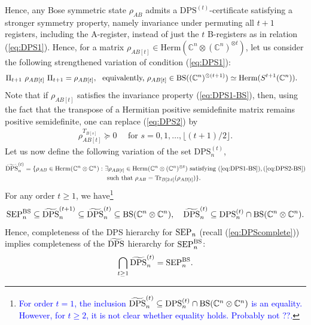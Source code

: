 \documentclass[11pt]{article}
\newcommand{\C}{\ensuremath{\mathbb{C}}} %
\newcommand{\Perm}{\mathfrak G}
\newcommand{\Herm}{\mathrm{Herm}}
\newcommand{\Cnn}{\C^n\ot \C^n}
\newcommand{\Cnnt}{\C^n\ot (\C^n)^{\ot t}}
\newcommand{\SEP}{\text{\rm SEP}}
\newcommand{\DPS}{\text{\rm DPS}}
\newcommand{\DPSt}{\mathrm{DPS}^{(t)}}
\newcommand{\SEPBS}{\SEP^{\BS}}
\newcommand{\tilDPS}{\widetilde {\DPS}}
\newcommand{\tilDPSt}{\widetilde{\DPS}^{(t)}}
\newcommand{\Tr}{\text{\rm Tr}}
\newcommand{\ot}{\otimes}
\newcommand{\BS}{\text{\rm BS}}
\newcommand{\ui}{\underline{i}}
\newcommand{\uj}{\underline{j}}
\theoremstyle{plain}
\newcommand{\ML}{\textcolor{blue}}
\begin{document}
{%
Hence,  any Bose symmetric state $\rho_{AB}$ admits a $\DPSt$-certificate satisfying a stronger symmetry property, namely invariance under permuting all $t+1$ registers, including the A-register, instead of just the $t$ B-registers as  in relation (\ref{eq:DPS1}). Hence, for a matrix $\rho_{AB[t]} \in \Herm(\Cnnt)$, let us consider the following strengthened variation of condition (\ref{eq:DPS1}):
\begin{align}\label{eq:DPS1-BS}
\begin{split}
&\Pi_{t+1} \ \rho_{AB[t]}\ \Pi_{t+1}=\rho_{AB[t]},\  \text{   equivalently, } \rho_{AB[t]}\in \BS((\C^n)^{\ot (t+1)})\simeq \Herm(S^{t+1}(\C^n)).
\end{split}
\end{align}
Note that if $\rho_{AB[t]}$ 
 satisfies  the invariance property (\ref{eq:DPS1-BS}), 
then, using the fact that the transpose of a Hermitian positive semidefinite matrix remains positive semidefinite,
 one can %
 replace (\ref{eq:DPS2}) by
 \begin{align}\label{eq:DPS2-BS}
 \rho_{AB[t]}^{T_{B[s]}}\succeq 0 \quad \text{ for } s=0, 1,\ldots,  \lfloor (t+1)/2\rfloor.
 \end{align}
Let us now define the following   variation of the set $\DPSt_n$, 
\begin{align}\label{eq:DPSt-BS}
\begin{split}
\tilDPSt_n=\{\rho_{AB}\in\Herm(\Cnn):\ &  \exists \rho_{AB[t]}\in\Herm(\Cnnt) \text{ satisfying } (\ref{eq:DPS1-BS}), (\ref{eq:DPS2-BS}) \\
& \text{ such that }   \rho_{AB}=\Tr_{B[2:t]}(\rho_{AB[t]})\}.
\end{split}
\end{align}
For any order  $t\ge 1$, we have\footnote{\ML{For order $t=1$, the inclusion $\tilDPSt_n\subseteq \DPSt_n\cap \BS(\Cnn)$ is an equality. However, for $t\ge 2$, it is not clear whether equality holds. Probably not ??.}}
$$\SEPBS_n\subseteq \tilDPS^{(t+1)}_n\subseteq \tilDPSt_n\subseteq \BS(\Cnn),\quad
\tilDPSt_n\subseteq \DPSt_n\cap \BS(\Cnn).$$
Hence, completeness of the DPS hierarchy for $\SEP_n$ (recall (\ref{eq:DPScomplete})) implies completeness of the $\tilDPS$ hierarchy for $\SEPBS_n$:
$$\bigcap_{t\ge 1}\tilDPSt_n =\SEPBS_n.$$  
}
\end{document}
